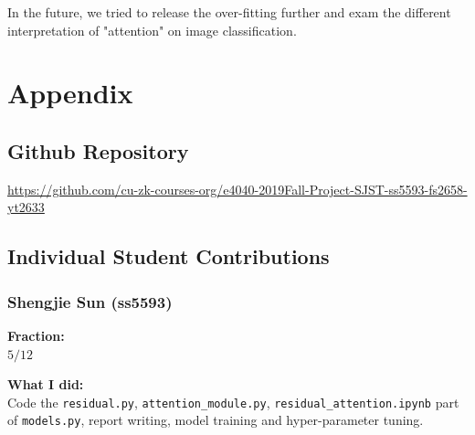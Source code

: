 \documentclass{article}
\begin{document}
\begin{multicols}{2}
In the future, we tried to release the over-fitting further and exam the different interpretation of "attention" on image classification. 





\section{Appendix}
\subsection{Github Repository}
\href{https://github.com/cu-zk-courses-org/e4040-2019Fall-Project-SJST-ss5593-fs2658-yt2633}{https://github.com/cu-zk-courses-org/e4040-2019Fall-Project-SJST-ss5593-fs2658-yt2633}

\subsection{Individual Student Contributions}
\subsubsection*{Shengjie Sun (ss5593)}
\textbf{Fraction:} \\
$5/12$

\textbf{What I did:} \\
Code the \texttt{residual.py}, \texttt{attention\_module.py}, \texttt{residual\_attention.ipynb} part of \texttt{models.py}, report writing, model training and hyper-parameter tuning.
\end{multicols}

\newpage



\end{document}
